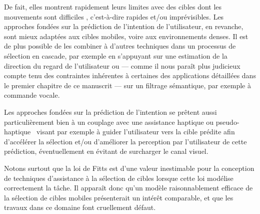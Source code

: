     De fait, elles montrent rapidement leurs limites avec des cibles dont les mouvements sont \og difficiles \fg{}, c'est-à-dire rapides et/ou imprévisibles. Les approches fondées sur la prédiction de l'intention de l'utilisateur, en revanche, sont mieux adaptées aux cibles mobiles, voire aux environnements denses. Il est de plus possible de les combiner à d'autres techniques dans un processus de sélection en cascade, par exemple en s'appuyant sur une estimation de la direction du regard de l'utilisateur ou --- comme il nous paraît plus judicieux compte tenu des contraintes inhérentes à certaines des applications détaillées dans le premier chapitre de ce manuscrit --- sur un filtrage sémantique, par exemple à commande vocale.
    
    Les approches fondées sur la prédiction de l'intention se prêtent aussi particulièrement bien à un couplage avec une assistance haptique ou pseudo-haptique~\cite{lecuyer2009simulating, pusch2011pseudo} visant par exemple à guider l'utilisateur vers la cible prédite afin d'accélérer la sélection et/ou d'améliorer la perception par l'utilisateur de cette prédiction, éventuellement en évitant de surcharger le canal visuel.
    
    Notons surtout que la loi de Fitts est d'une valeur inestimable pour la conception de techniques d'assistance à la sélection de cibles lorsque cette loi modélise correctement la tâche. Il apparaît donc qu'un modèle raisonnablement efficace de la sélection de cibles mobiles présenterait un intérêt comparable, et que les travaux dans ce domaine font cruellement défaut.

\clearpage
